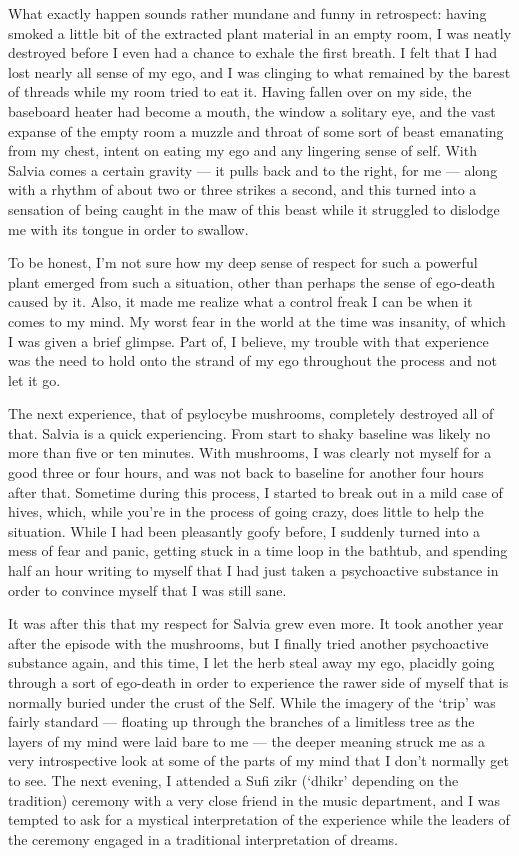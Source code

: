 \documentclass{book}
\begin{document}
What exactly happen sounds rather mundane and funny in retrospect: having smoked a little bit of the extracted plant material in an empty room, I was neatly destroyed before I even had a chance to exhale the first breath.  I felt that I had lost nearly all sense of my ego, and I was clinging to what remained by the barest of threads while my room tried to eat it.  Having fallen over on my side, the baseboard heater had become a mouth, the window a solitary eye, and the vast expanse of the empty room a muzzle and throat of some sort of beast emanating from my chest, intent on eating my ego and any lingering sense of self.  With Salvia comes a certain gravity --- it pulls back and to the right, for me --- along with a rhythm of about two or three strikes a second, and this turned into a sensation of being caught in the maw of this beast while it struggled to dislodge me with its tongue in order to swallow.

To be honest, I'm not sure how my deep sense of respect for such a powerful plant emerged from such a situation, other than perhaps the sense of ego-death caused by it.  Also, it made me realize what a control freak I can be when it comes to my mind.  My worst fear in the world at the time was insanity, of which I was given a brief glimpse.  Part of, I believe, my trouble with that experience was the need to hold onto the strand of my ego throughout the process and not let it go.

The next experience, that of psylocybe mushrooms, completely destroyed all of that.  Salvia is a quick experiencing.  From start to shaky baseline was likely no more than five or ten minutes.  With mushrooms, I was clearly not myself for a good three or four hours, and was not back to baseline for another four hours after that.  Sometime during this process, I started to break out in a mild case of hives, which, while you're in the process of going crazy, does little to help the situation.  While I had been pleasantly goofy before, I suddenly turned into a mess of fear and panic, getting stuck in a time loop in the bathtub, and spending half an hour writing to myself that I had just taken a psychoactive substance in order to convince myself that I was still sane.

It was after this that my respect for Salvia grew even more.  It took another year after the episode with the mushrooms, but I finally tried another psychoactive substance again, and this time, I let the herb steal away my ego, placidly going through a sort of ego-death in order to experience the rawer side of myself that is normally buried under the crust of the Self.  While the imagery of the `trip' was fairly standard --- floating up through the branches of a limitless tree as the layers of my mind were laid bare to me --- the deeper meaning struck me as a very introspective look at some of the parts of my mind that I don't normally get to see.  The next evening, I attended a Sufi zikr (`dhikr' depending on the tradition) ceremony with a very close friend in the music department, and I was tempted to ask for a mystical interpretation of the experience while the leaders of the ceremony engaged in a traditional interpretation of dreams.
\end{document}
